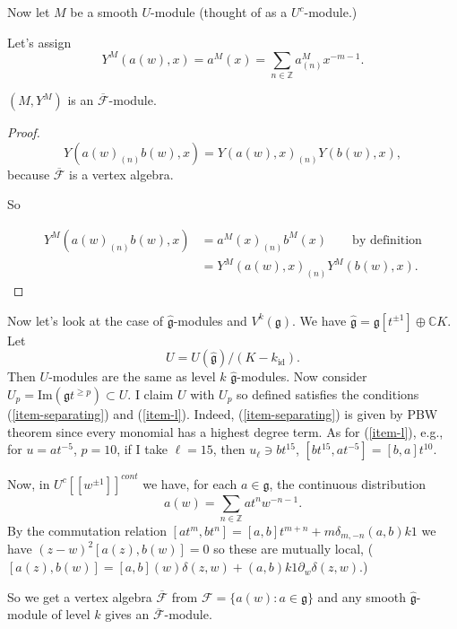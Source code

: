 \medskip\noindent
Now let $M$ be a smooth $U$-module
(thought of as a $U^c$-module.)

Let's assign
$$
Y^M(a(w),x)=a^M(x)=\sum_{n \in \mathbb{Z}}a^M_{(n)}x^{-m-1}.
$$

\begin{proposition}
\label{proposition-smooth-f-module}
$(M,Y^M)$ is an $\overline{\mathcal{F}}$-module.
\end{proposition}

\begin{proof}
$$
Y(a(w)_{(n)}b(w),x)=Y(a(w),x)_{(n)}Y(b(w),x),
$$
because $\overline{\mathcal{F}}$ is a vertex algebra.

So 

\begin{align*}
Y^M(a(w)_{(n)}b(w),x)&=a^M(x)_{(n)}b^M(x)\qquad 
\text{by definition}\\
&=Y^M(a(w),x)_{(n)}Y^M(b(w),x).
\end{align*}
\end{proof}


\medskip\noindent
Now  let's look at the case of $\hat{\mathfrak{g}}$-modules and
$V^k(\mathfrak{g})$.
We have $\hat{\mathfrak{g}}=\mathfrak{g}[t^{\pm 1}] \oplus \mathbb{C}K$.
Let
$$
U=U(\hat{\mathfrak{g}})/(K-k_\text{id}).
$$
Then $U$-modules are the same as level $k$ 
$\hat{\mathfrak{g}}$-modules.
Now consider $U_p=\text{Im}(\mathfrak{g}t^{\geq p})\subset U$.
I claim $U$ with $U_p$ so defined satisfies the conditions
(\ref{item-separating}) and (\ref{item-l}).
Indeed, (\ref{item-separating}) is given by PBW theorem
since every monomial has a highest degree term.
As for (\ref{item-l}), e.g., for $u=at^{-5}$, $p=10$, if I take
$\ell=15$, then $u_\ell \ni bt^{15}$,
$[bt^{15},at^{-5}]=[b,a]t^{10}$.

Now, in $U^c[[w^{\pm 1}]]^{cont}$ we have, for each
$a \in \mathfrak{g}$, the continuous distribution
$$
a(w)=\sum_{n \in \mathbb{Z}}at^n w^{-n-1}.
$$
By the commutation relation
$[at^m,bt^n]=[a,b]t^{m+n}+m\delta_{m,-n}(a,b)k 1$
we have $(z-w)^2[a(z),b(w)]=0$
so these are mutually local,
($[a(z),b(w)]=[a,b](w)\delta(z,w)+(a,b)k 1 \partial_w \delta(z,w)$.)

So we get a vertex algebra $\overline{\mathcal{F}}$ 
from $\mathcal{F}=\{a(w):a \in \mathfrak{g}\}$
and any smooth  $\hat{\mathfrak{g}}$-module of level $k$ gives
an $\overline{\mathcal{F}}$-module.


